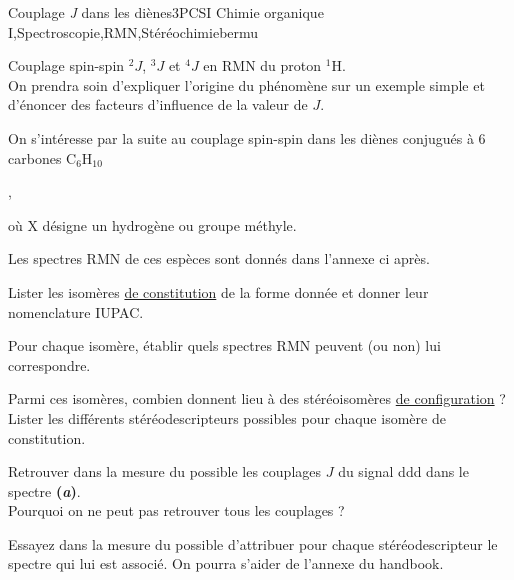 
\begin{exercise}{Couplage \textit{J} dans les diènes}{3}{PCSI}
{Chimie organique I,Spectroscopie,RMN,Stéréochimie}{bermu}

\begin{questions}
\questioncours Couplage spin-spin $^{2}J$, $^{3}J$ et $^{4}J$ en RMN du proton $^{1}$H. \\
On prendra soin d'expliquer l'origine du phénomène sur un exemple simple et d'énoncer des facteurs d'influence de la valeur de $J$.

\begin{EnvUplevel}
On s'intéresse par la suite au couplage spin-spin dans les diènes conjugués à 6 carbones $\mathrm{C_6H_{10}}$

\begin{center}
    ,
\end{center}
où X désigne un hydrogène ou groupe méthyle.

Les spectres RMN de ces espèces sont donnés dans l'annexe ci après.
\end{EnvUplevel}

\question Lister les isomères \underline{de constitution} de la forme donnée et donner leur nomenclature IUPAC.

\question Pour chaque isomère, établir quels spectres RMN peuvent (ou non) lui correspondre.

\question Parmi ces isomères, combien donnent lieu à des stéréoisomères \underline{de configuration} ? \\
Lister les différents stéréodescripteurs possibles pour chaque isomère de constitution.


\question Retrouver dans la mesure du possible les couplages $J$ du signal ddd dans le spectre \textbf{(\textit{a})}. \\
Pourquoi on ne peut pas retrouver tous les couplages ?

\question Essayez dans la mesure du possible d'attribuer pour chaque stéréodescripteur le spectre qui lui est associé. On pourra s'aider de l'annexe du handbook.
\end{questions}

\end{exercise}

